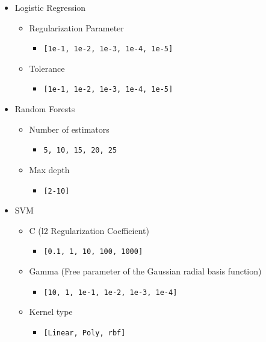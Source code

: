 \begin{itemize}
	\item Logistic Regression
	\begin{itemize}
		\item Regularization Parameter
			\begin{itemize}
				\item \texttt{[1e-1, 1e-2, 1e-3, 1e-4, 1e-5]}
			\end{itemize}
		\item Tolerance
			\begin{itemize}
				\item \texttt{[1e-1, 1e-2, 1e-3, 1e-4, 1e-5]}
			\end{itemize}
	\end{itemize}

	\item Random Forests
		\begin{itemize}
			\item Number of estimators
			\begin{itemize}
				\item \texttt{5, 10, 15, 20, 25}
			\end{itemize}
			\item Max depth
			\begin{itemize}
				\item \texttt{[2-10]}
			\end{itemize}
		\end{itemize}
	\item SVM
		\begin{itemize}
			\item C (l2 Regularization Coefficient)
			\begin{itemize}
				\item \texttt{[0.1, 1, 10, 100, 1000]}
			\end{itemize}
			\item Gamma (Free parameter of the Gaussian radial basis function)
			\begin{itemize}
				\item \texttt{[10, 1, 1e-1, 1e-2, 1e-3, 1e-4]}
			\end{itemize}
		
		\item Kernel type
		\begin{itemize}
			\item \texttt{[Linear, Poly, rbf]}
		\end{itemize}
		\end{itemize}
\end{itemize}

